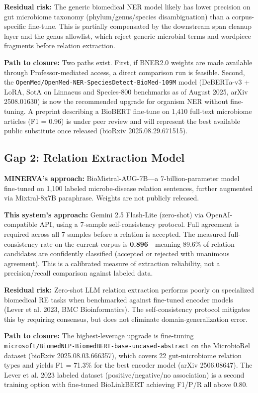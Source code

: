 \documentclass[12pt, letterpaper]{article}
\begin{document}
\textbf{Residual risk:} The generic biomedical NER model likely has lower precision on gut microbiome taxonomy (phylum/genus/species disambiguation) than a corpus-specific fine-tune. This is partially compensated by the downstream span cleanup layer and the genus allowlist, which reject generic microbial terms and wordpiece fragments before relation extraction.

\textbf{Path to closure:} Two paths exist. First, if BNER2.0 weights are made available through Professor-mediated access, a direct comparison run is feasible. Second, the \texttt{OpenMed/OpenMed-NER-SpeciesDetect-BioMed-109M} model (DeBERTa-v3 + LoRA, SotA on Linnaeus and Species-800 benchmarks as of August 2025, arXiv 2508.01630) is now the recommended upgrade for organism NER without fine-tuning. A preprint describing a BioBERT fine-tune on 1,410 full-text microbiome articles (F1 = 0.96) is under peer review and will represent the best available public substitute once released (bioRxiv 2025.08.29.671515).

\subsection{Gap 2: Relation Extraction Model}

\textbf{MINERVA's approach:} BioMistral-AUG-7B—a 7-billion-parameter model fine-tuned on 1,100 labeled microbe-disease relation sentences, further augmented via Mixtral-8x7B paraphrase. Weights are not publicly released.

\textbf{This system's approach:} Gemini 2.5 Flash-Lite (zero-shot) via OpenAI-compatible API, using a 7-sample self-consistency protocol. Full agreement is required across all 7 samples before a relation is accepted. The measured full-consistency rate on the current corpus is \textbf{0.896}—meaning 89.6\% of relation candidates are confidently classified (accepted or rejected with unanimous agreement). This is a calibrated measure of extraction reliability, not a precision/recall comparison against labeled data.

\textbf{Residual risk:} Zero-shot LLM relation extraction performs poorly on specialized biomedical RE tasks when benchmarked against fine-tuned encoder models (Lever et al. 2023, BMC Bioinformatics). The self-consistency protocol mitigates this by requiring consensus, but does not eliminate domain-generalization error.

\textbf{Path to closure:} The highest-leverage upgrade is fine-tuning \texttt{microsoft/BiomedNLP-BiomedBERT-base-uncased-abstract} on the MicrobioRel dataset (bioRxiv 2025.08.03.666357), which covers 22 gut-microbiome relation types and yields F1 = 71.3\% for the best encoder model (arXiv 2506.08647). The Lever et al. 2023 labeled dataset (positive/negative/no association) is a second training option with fine-tuned BioLinkBERT achieving F1/P/R all above 0.80.
\end{document}
